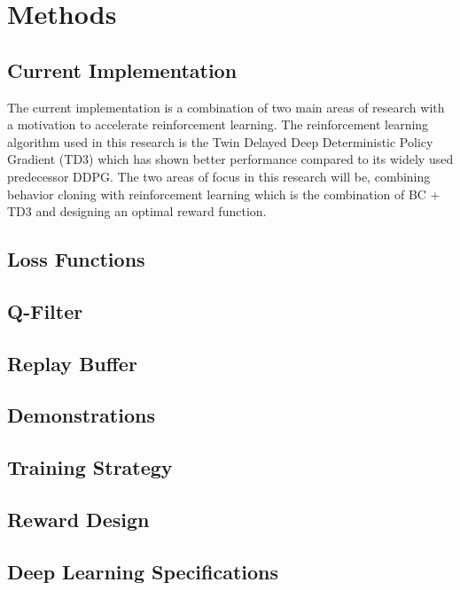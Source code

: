 \section{Methods} \label{section:methods}

\subsection{Current Implementation}

The current implementation is a combination of two main areas of research with a motivation to accelerate reinforcement learning. The reinforcement learning algorithm used in this research is the Twin Delayed Deep Deterministic Policy Gradient (TD3) which has shown better performance compared to its widely used predecessor DDPG. The two areas of focus in this research will be, combining behavior cloning with reinforcement learning which is the combination of BC + TD3 and designing an optimal reward function. \\

\subsection{Loss Functions}

\subsection{Q-Filter}

\subsection{Replay Buffer}

\subsection{Demonstrations}

\subsection{Training Strategy}

\subsection{Reward Design}

\subsection{Deep Learning Specifications}

